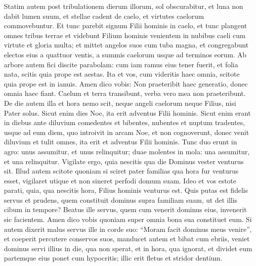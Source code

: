 \begin{biblechapter}
\verse Statim autem post tribulationem dierum illorum, sol obscurabitur, et luna non dabit lumen suum, et stellae cadent de caelo, et virtutes caelorum commovebuntur. 
\verse Et tunc parebit signum Filii hominis in caelo, et tunc plangent omnes tribus terrae et videbunt Filium hominis venientem in nubibus caeli cum virtute et gloria multa; 
\verse et mittet angelos suos cum tuba magna, et congregabunt electos eius a quattuor ventis, a summis caelorum usque ad terminos eorum. 
\verse Ab arbore autem fici discite parabolam: cum iam ramus eius tener fuerit, et folia nata, scitis quia prope est aestas. 
\verse Ita et vos, cum videritis haec omnia, scitote quia prope est in ianuis. 
\verse Amen dico vobis: Non praeteribit haec generatio, donec omnia haec fiant. 
\verse Caelum et terra transibunt, verba vero mea non praeteribunt. 
\verse De die autem illa et hora nemo scit, neque angeli caelorum neque Filius, nisi Pater solus. 
\verse Sicut enim dies Noe, ita erit adventus Filii hominis. 
\verse Sicut enim erant in diebus ante diluvium comedentes et bibentes, nubentes et nuptum tradentes, usque ad eum diem, quo introivit in arcam Noe, 
\verse et non cognoverunt, donec venit diluvium et tulit omnes, ita erit et adventus Filii hominis. 
\verse Tunc duo erunt in agro: unus assumitur, et unus relinquitur;  
\verse duae molentes in mola: una assumitur, et una relinquitur. 
\verse Vigilate ergo, quia nescitis qua die Dominus vester venturus sit. 
\verse Illud autem scitote quoniam si sciret pater familias qua hora fur venturus esset, vigilaret utique et non sineret perfodi domum suam. 
\verse Ideo et vos estote parati, quia, qua nescitis hora, Filius hominis venturus est. 
\verse Quis putas est fidelis servus et prudens, quem constituit dominus supra familiam suam, ut det illis cibum in tempore? 
\verse Beatus ille servus, quem cum venerit dominus eius, invenerit sic facientem. 
\verse Amen dico vobis quoniam super omnia bona sua constituet eum. 
\verse Si autem dixerit malus servus ille in corde suo: “Moram facit dominus meus venire”, 
\verse et coeperit percutere conservos suos, manducet autem et bibat cum ebriis, 
\verse veniet dominus servi illius in die, qua non sperat, et in hora, qua ignorat, 
\verse et dividet eum partemque eius ponet cum hypocritis; illic erit fletus et stridor dentium. 
\end{biblechapter}

